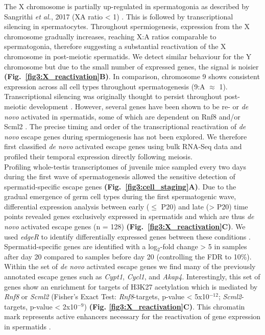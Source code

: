 The X chromosome is partially up-regulated in spermatogonia as described by Sangrithi \emph{et al.}, 2017 (\gls{XA} ratio < 1) \citep{Sangrithi2017}. 
This is followed by transcriptional silencing in spermatocytes. 
Throughout spermiogenesis, expression from the X chromosome gradually increases, reaching X:A ratios comparable to spermatogonia, therefore suggesting a substantial reactivation of the X chromosome in post-meiotic spermatids. 
We detect similar behaviour for the Y chromosome but due to the small number of expressed genes, the signal is noisier \textbf{(Fig.~\ref{fig3:X_reactivation}B)}. 
In comparison, chromosome 9 shows consistent expression across all cell types throughout spermatogenesis (9:A $\approx$ 1).\\

Transcriptional silencing was originally thought to persist throughout post-meiotic development \citep{Greaves2006, Turner2006}. 
However, several genes have been shown to be re- or \emph{de novo} activated in spermatids, some of which are dependent on \gls{Rnf8} and/or \gls{Scml2} \citep{Hasegawa2015a, Sin2012, Sin2015}. 
The precise timing and order of the transcriptional reactivation of \emph{de novo} escape genes during spermiogenesis has not been explored. 
We therefore first classified \emph{de novo} activated escape genes using bulk RNA-Seq data and profiled their temporal expression directly following meiosis.\\

Profiling whole-testis transcriptomes of juvenile mice sampled every two days during the first wave of spermatogenesis allowed the sensitive detection of spermatid-specific escape genes \textbf{(Fig.~\ref{fig3:cell_staging}A)}. 
Due to the gradual emergence of germ cell types during the first spermatogenic wave, differential expression analysis between early ($\leq$ P20) and late (> P20) time points revealed genes exclusively expressed in spermatids and which are thus \emph{de novo} activated escape genes (n = 128) \textbf{(Fig.~\ref{fig3:X_reactivation}C)}. 
We used \emph{edgeR} to identify differentially expressed genes between these conditions \citep{Robinson2009}. 
Spermatid-specific genes are identified with a log$_2$-fold change > 5 in samples after day 20 compared to samples before day 20 (controlling the FDR to 10\%). \\

Within the set of \emph{de novo} activated escape genes we find many of the previously annotated escape genes such as \textit{Cypt1}, \textit{Cycl1}, and \textit{Akap4}. 
Interestingly, this set of genes show an enrichment for targets of H3K27 acetylation which is mediated by \textit{Rnf8} or \textit{Scml2} (Fisher's Exact Test: \textit{Rnf8}-targets, p-value < 5x10$^{-12}$; \textit{Scml2}-targets, p-value < 2x10$^{-9}$) \textbf{(Fig. \ref{fig3:X_reactivation}C)}. 
This chromatin mark represents active enhancers necessary for the reactivation of gene expression in spermatids \citep{Adams2018}. \\

